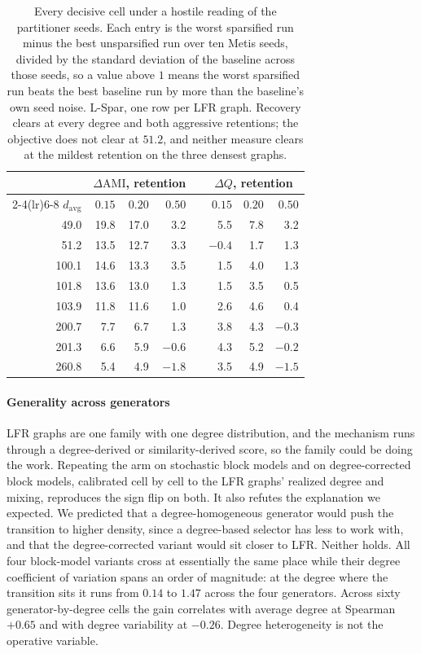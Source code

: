 \begin{table}[t]
\centering
\caption{Every decisive cell under a hostile reading of the partitioner seeds.
Each entry is the worst sparsified run minus the best unsparsified run over ten
Metis seeds, divided by the standard deviation of the baseline across those
seeds, so a value above $1$ means the worst sparsified run beats the best
baseline run by more than the baseline's own seed noise. L-Spar, one row per LFR
graph. Recovery clears at every degree and both aggressive retentions; the
objective does not clear at $51.2$, and neither measure clears at the mildest
retention on the three densest graphs.}
\label{tab:seeds}
\footnotesize
\setlength{\tabcolsep}{3.5pt}
\begin{tabular}{@{}rrrrcrrr@{}}
\toprule
& \multicolumn{3}{c}{$\Delta\mathrm{AMI}$, retention} & &
  \multicolumn{3}{c}{$\Delta Q$, retention}\\
\cmidrule(lr){2-4}\cmidrule(lr){6-8}
$d_{\mathrm{avg}}$ & $0.15$ & $0.20$ & $0.50$ & & $0.15$ & $0.20$ & $0.50$\\
\midrule
 49.0 & 19.8 & 17.0 &  3.2 & &  5.5 & 7.8 &  3.2\\
 51.2 & 13.5 & 12.7 &  3.3 & & $-0.4$ & 1.7 &  1.3\\
100.1 & 14.6 & 13.3 &  3.5 & &  1.5 & 4.0 &  1.3\\
101.8 & 13.6 & 13.0 &  1.3 & &  1.5 & 3.5 &  0.5\\
103.9 & 11.8 & 11.6 &  1.0 & &  2.6 & 4.6 &  0.4\\
200.7 &  7.7 &  6.7 &  1.3 & &  3.8 & 4.3 & $-0.3$\\
201.3 &  6.6 &  5.9 & $-0.6$ & &  4.3 & 5.2 & $-0.2$\\
260.8 &  5.4 &  4.9 & $-1.8$ & &  3.5 & 4.9 & $-1.5$\\
\bottomrule
\end{tabular}
\end{table}

\paragraph{Generality across generators}
LFR graphs are one family with one degree distribution, and the mechanism runs
through a degree-derived or similarity-derived score, so the family could be
doing the work. Repeating the arm on stochastic block models and on
degree-corrected block models, calibrated cell by cell to the LFR graphs'
realized degree and mixing, reproduces the sign flip on both. It also refutes the
explanation we expected. We predicted that a degree-homogeneous generator would
push the transition to higher density, since a degree-based selector has less to
work with, and that the degree-corrected variant would sit closer to LFR. Neither
holds. All four block-model variants cross at essentially the same place while
their degree coefficient of variation spans an order of magnitude: at the degree
where the transition sits it runs from $0.14$ to $1.47$ across the four
generators. Across sixty generator-by-degree cells the gain correlates with
average degree at Spearman $+0.65$ and with degree variability at $-0.26$. Degree
heterogeneity is not the operative variable.

